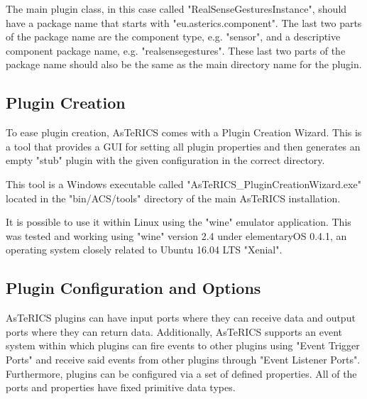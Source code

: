 \documentclass[BSA,Bachelor,english]{twbook}%
\begin{document}
The main plugin class, in this case called "RealSenseGesturesInstance", should have a package name that starts with "eu.asterics.component". The last two parts of the package name are the component type, e.g. "sensor", and a descriptive component package name, e.g. "realsensegestures". These last two parts of the package name should also be the same as the main directory name for the plugin.

\subsection{Plugin Creation}

To ease plugin creation, AsTeRICS comes with a Plugin Creation Wizard. This is a tool that provides a GUI for setting all plugin properties and then generates an empty "stub" plugin with the given configuration in the correct directory.

This tool is a Windows executable called "AsTeRICS\_PluginCreationWizard.exe" located in the "bin/ACS/tools" directory of the main AsTeRICS installation.

It is possible to use it within Linux using the "wine" emulator application. This was tested and working using "wine" version 2.4 under elementaryOS 0.4.1, an operating system closely related to Ubuntu 16.04 LTS "Xenial".


\subsection{Plugin Configuration and Options}

AsTeRICS plugins can have input ports where they can receive data and output ports where they can return data. Additionally, AsTeRICS supports an event system within which plugins can fire events to other plugins using "Event Trigger Ports" and receive said events from other plugins through "Event Listener Ports". Furthermore, plugins can be configured via a set of defined properties. All of the ports and properties have fixed primitive data types.
\end{document}

